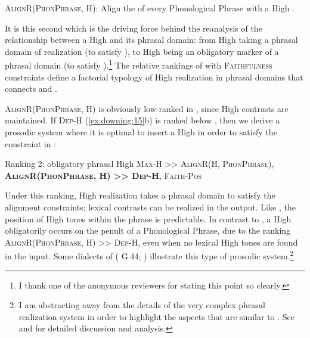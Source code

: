 \documentclass[output=paper
,newtxmath
,modfonts
,nonflat]{../langsci/langscibook}
\begin{document}
\ea\label{ex:downing:20}\textsc{AlignR(PhonPhrase, H}):
Align the  of every Phonological Phrase with a High .
\z

It is this second  which is the driving force behind the reanalysis of the relationship between a High  and its phrasal domain: from High  taking a phrasal domain of realization (to satisfy ), to High  being an obligatory marker of a phrasal domain (to satisfy ).\footnote{I thank one of the anonymous reviewers for stating this point so clearly.} The relative rankings of  with \textsc{Faithfulness} constraints define a factorial typology of High  realization in phrasal domains that connects  and .

\textsc{AlignR(PhonPhrase, H}) is obviously low-ranked in , since High  contrasts are maintained. If \textsc{Dep-H} (\ref{ex:downing:15}b) is ranked below , then we derive a prosodic system where it is optimal to insert a High  in order to satisfy the constraint in :
\begin{comment}
\end{comment}
\ea\label{ex:downing:21} Ranking 2: obligatory phrasal High 
\sn
\textsc{Max-H >> AlignR(H, PhonPhrase}), \textbf{\textsc{AlignR(PhonPhrase, H}}\textbf{) \textsc{>> Dep-H}}\textsc{, Faith-Pos}
\z

Under this ranking, High  realization takes a phrasal domain to satisfy the alignment constraints; lexical  contrasts can be realized in the output. Like , the position of High tones within the phrase is predictable. In contrast to , a High  obligatorily occurs on the penult of a Phonological Phrase, due to the ranking \textsc{AlignR(PhonPhrase, H}) >> \textsc{Dep-H}, even when no lexical High tones are found in the input. Some dialects of  ( G.44; \citealt{Cassimjee&Kisseberth1998,Patin2017}) illustrate this type of prosodic system.\footnote{I am abstracting away from the details of the very complex  phrasal  realization system in order to highlight the aspects that are similar to . See \citet{Cassimjee&Kisseberth1998,Patin2007,Patin2017} and \citet{Philipson2005} for detailed discussion and analysis.}
\end{document}
